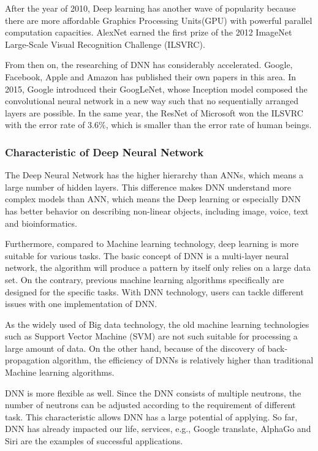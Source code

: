 \documentclass[article]{aaltoseries}
\begin{document}
After the year of 2010, Deep learning has another wave of popularity because there are more affordable Graphics Processing Units(GPU)
 with powerful parallel computation capacities. AlexNet\cite{NIPS2012_4824} earned the first prize of 
the 2012 ImageNet Large-Scale Visual Recognition Challenge (ILSVRC). 

From then on, the researching of DNN has considerably accelerated. Google, Facebook, Apple and Amazon has published
their own papers in this area. In 2015, Google introduced their GoogLeNet\cite{GoogLeNet}, whose Inception model composed the convolutional 
neural network in a new way such that no sequentially arranged layers are possible. In the same year, the ResNet\cite{ResNet} of Microsoft won 
the ILSVRC with the error rate of 3.6\%, which is smaller than the error rate of human beings.




\subsubsection{Characteristic of Deep Neural Network}

The Deep Neural Network has the higher hierarchy than ANNs, which means a large number of hidden layers\cite{MAL-006}. 
This difference makes DNN understand more complex models than ANN, which means the Deep learning or especially DNN
has better behavior on describing non-linear objects, including image, voice, text and bioinformatics.

Furthermore, compared to Machine learning technology, deep learning is more suitable for various tasks. The basic concept
of DNN is a multi-layer neural network, the algorithm will produce a pattern by itself only relies on a large data set.
On the contrary, previous machine learning algorithms specifically are designed for the specific tasks. 
With DNN technology, users can tackle different issues with one implementation of DNN. 

As the widely used of Big data technology, the old machine learning technologies such as Support Vector Machine (SVM) are
not such suitable for processing a large amount of data. On the other hand, because of the discovery of back-propagation
algorithm, the efficiency of DNNs is relatively higher than traditional Machine learning algorithms.

DNN is more flexible as well. Since the DNN consists of multiple neutrons, the number of neutrons can be adjusted
according to the requirement of different task. This characteristic allows DNN has a large potential of applying. So far, 
DNN has already impacted our life, services, e.g., Google translate, AlphaGo and Siri are the examples of successful applications.
\end{document}
